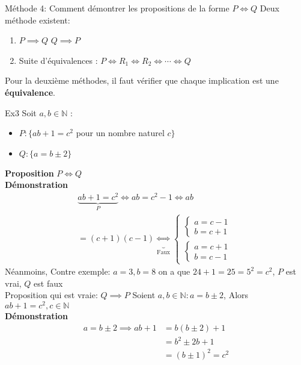 \begin{parag}{Méthode 4: Comment démontrer les propositions de la forme $P \iff Q$}
    Deux méthode existent:
    \begin{enumerate}
        \item $P \implies Q$  $Q \implies P$
        \item Suite d'équivalences : $P \iff R_1 \iff R_2 \iff \cdots \iff Q$
    \end{enumerate}
    \begin{framedremark}
        Pour la deuxième méthodes, il faut vérifier que chaque implication est une \textbf{équivalence}.
    \end{framedremark}
    \begin{subparag}{Ex3}
        Soit $a, b \in \mathbb{N}$ : 
        \begin{itemize}
            \item $P : \{ ab + 1 = c^2$ pour un nombre naturel $c \}$
            \item $Q: \{a = b \pm 2\}$
            
        \end{itemize}
        \textbf{Proposition} $P \iff Q$
        \\
        \textbf{Démonstration}
        \begin{align*}
            \underbrace{ab + 1 = c^2}_P \iff ab = c^2 - 1 \iff ab\\
            = (c+1)(c-1) \underbrace{\iff}_{\text{Faux}} \begin{cases}
                \begin{cases}
                    a = c-1 \\
                    b = c + 1 
                \end{cases}\\
                \begin{cases}
                    a = c+1 \\
                    b = c-1
                \end{cases}
            \end{cases}
        \end{align*}
        Néanmoins, Contre exemple:
        $a = 3, b=8$ on a que $24 + 1 = 25  = 5^2 = c^2$, $P$ est vrai, $Q$ est faux\\
        Proposition qui est vraie: $Q \implies P$ Soient $a, b \in \mathbb{N} : a = b \pm 2$, Alors $ab + 1 = c^2, c \in \mathbb{N}$
        \\
        \textbf{Démonstration}
        \begin{align*}
            a = b \pm 2 \implies ab + 1 &= b(b\pm 2) + 1\\ &= b^2 \pm 2b + 1 \\&= (b \pm 1)^2 = c^2
        \end{align*}
    \end{subparag}


\end{parag}
